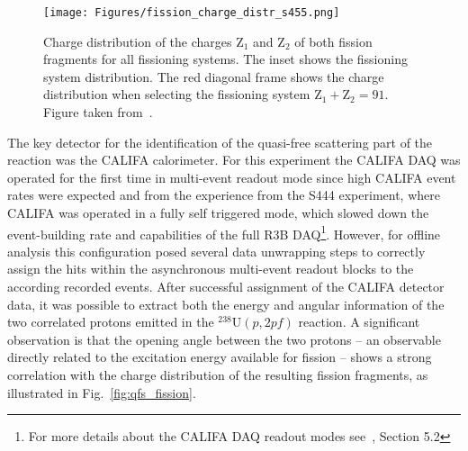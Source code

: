 \begin{figure}[htpb]
    \centering
    \texttt{[image: Figures/fission\_charge\_distr\_s455.png]}
    \caption{
    Charge distribution of the charges $\text{Z}_1$ and $\text{Z}_2$ of both fission fragments for all fissioning systems. The inset shows the fissioning system distribution. The red diagonal frame shows the charge distribution when selecting the fissioning system $\text{Z}_1 + \text{Z}_2 = 91$. Figure taken from~\cite{grana2023fission}.
    }
    \label{fig:charge_distr_s455}
\end{figure}

The key detector for the identification of the quasi-free scattering part of the reaction was the CALIFA calorimeter. For this experiment the CALIFA DAQ was operated for the first time in multi-event readout mode since high CALIFA event rates were expected and from the experience from the S444 experiment, where CALIFA was operated in a fully self triggered mode, which slowed down the event-building rate and capabilities of the full R3B DAQ\footnote{For more details about the CALIFA DAQ readout modes see~\cite{pklenze}, Section 5.2}.\newline
However, for offline analysis this configuration posed several data unwrapping steps to correctly assign the hits within the asynchronous multi-event readout blocks to the according recorded events.\newline
After successful assignment of the CALIFA detector data, it was possible to extract both the energy and angular information of the two correlated protons emitted in the \(^{238}\mathrm{U}(p,2p f)\) reaction. A significant observation is that the opening angle between the two protons -- an observable directly related to the excitation energy available for fission -- shows a strong correlation with the charge distribution of the resulting fission fragments, as illustrated in Fig.~\ref{fig:qfs_fission}.

